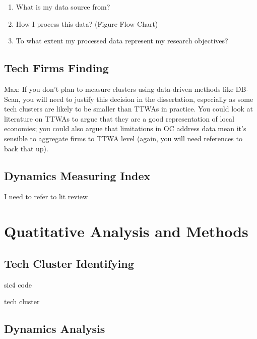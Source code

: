 \documentclass[
  12pt,
  oneside]{book}
\providecommand{\tightlist}{%
  \setlength{\itemsep}{0pt}\setlength{\parskip}{0pt}}
\begin{document}
\begin{enumerate}
\def\labelenumi{\arabic{enumi}.}
\tightlist
\item
  What is my data source from?
\item
  How I process this data?
  (Figure Flow Chart)
\item
  To what extent my processed data represent my research objectives?
\end{enumerate}

\hypertarget{tech-firms-finding}{%
\subsection{Tech Firms Finding}\label{tech-firms-finding}}

Max: If you don't plan to measure clusters using data-driven methods like DB-Scan, you will need to justify this decision in the dissertation, especially as some tech clusters are likely to be smaller than TTWAs in practice. You could look at literature on TTWAs to argue that they are a good representation of local economies; you could also argue that limitations in OC address data mean it's sensible to aggregate firms to TTWA level (again, you will need references to back that up).

\hypertarget{dynamics-measuring-index}{%
\subsection{Dynamics Measuring Index}\label{dynamics-measuring-index}}

I need to refer to lit review

\hypertarget{quatitative-analysis-and-methods}{%
\section{Quatitative Analysis and Methods}\label{quatitative-analysis-and-methods}}

\hypertarget{tech-cluster-identifying}{%
\subsection{Tech Cluster Identifying}\label{tech-cluster-identifying}}

sic4 code

tech cluster

\hypertarget{dynamics-analysis}{%
\subsection{Dynamics Analysis}\label{dynamics-analysis}}
\end{document}
